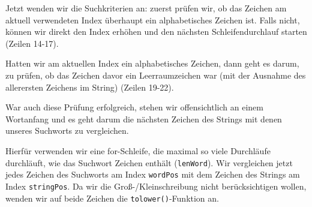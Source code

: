 Jetzt wenden wir die Suchkriterien an: zuerst prüfen wir, ob das Zeichen am
aktuell verwendeten Index überhaupt ein alphabetisches Zeichen ist. Falls nicht,
können wir direkt den Index erhöhen und den nächsten Schleifendurchlauf starten
(Zeilen 14-17).

Hatten wir am aktuellen Index ein alphabetisches Zeichen, dann geht es darum, zu
prüfen, ob das Zeichen davor ein Leerraumzeichen war (mit der Ausnahme des
allerersten Zeichens im String) (Zeilen 19-22).

War auch diese Prüfung erfolgreich, stehen wir offensichtlich an einem Wortanfang
und es geht darum die nächsten Zeichen des Strings mit denen unseres Suchworts
zu vergleichen.

Hierfür verwenden wir eine for-Schleife, die maximal so viele Durchläufe
durchläuft, wie das Suchwort Zeichen enthält (\texttt{lenWord}). Wir
vergleichen jetzt jedes Zeichen des Suchworts am Index \texttt{wordPos}
mit dem Zeichen des Strings am Index \texttt{stringPos}. Da wir die
Groß-/Kleinschreibung nicht berücksichtigen wollen, wenden wir auf beide Zeichen
die \texttt{tolower()}-Funktion an.

